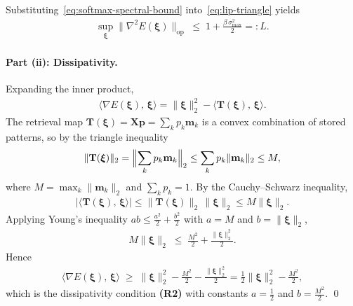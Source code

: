 Substituting~\eqref{eq:softmax-spectral-bound} into~\eqref{eq:lip-triangle} yields
\begin{align*}
\sup_{\boldsymbol{\xi}}\|\nabla^{2}E(\boldsymbol{\xi})\|_{\mathrm{op}}
\;\le\; 1 + \frac{\beta\,\sigma_{\max}^{2}}{2}
=: L.
\end{align*}

\paragraph{Part (ii): Dissipativity.}
Expanding the inner product,
\begin{align*}
\langle\nabla E(\boldsymbol{\xi}),\,\boldsymbol{\xi}\rangle
= \|\boldsymbol{\xi}\|_{2}^{2} - \langle\mathbf{T}(\boldsymbol{\xi}),\,\boldsymbol{\xi}\rangle.
\end{align*}
The retrieval map $\mathbf{T}(\boldsymbol{\xi})=\mathbf{X}\mathbf{p}=\sum_{k}p_{k}\mathbf{m}_{k}$ is a convex combination of stored patterns, so by the triangle inequality
\begin{align*}
\|\mathbf{T}(\boldsymbol{\xi})\|_{2}
= \Bigl\|\sum_{k}p_{k}\mathbf{m}_{k}\Bigr\|_{2}
\le \sum_{k}p_{k}\|\mathbf{m}_{k}\|_{2}
\le M,
\end{align*}
where $M=\max_{k}\|\mathbf{m}_{k}\|_{2}$ and $\sum_{k}p_{k}=1$. By the Cauchy--Schwarz inequality,
\begin{align*}
|\langle\mathbf{T}(\boldsymbol{\xi}),\,\boldsymbol{\xi}\rangle|
\le \|\mathbf{T}(\boldsymbol{\xi})\|_{2}\,\|\boldsymbol{\xi}\|_{2}
\le M\|\boldsymbol{\xi}\|_{2}.
\end{align*}
Applying Young's inequality $ab\le\tfrac{a^{2}}{2}+\tfrac{b^{2}}{2}$ with $a=M$ and $b=\|\boldsymbol{\xi}\|_{2}$,
\begin{align*}
M\|\boldsymbol{\xi}\|_{2}
\;\le\; \frac{M^{2}}{2} + \frac{\|\boldsymbol{\xi}\|_{2}^{2}}{2}.
\end{align*}
Hence
\begin{align*}
\langle\nabla E(\boldsymbol{\xi}),\,\boldsymbol{\xi}\rangle
\;\ge\; \|\boldsymbol{\xi}\|_{2}^{2} - \frac{M^{2}}{2} - \frac{\|\boldsymbol{\xi}\|_{2}^{2}}{2}
= \frac{1}{2}\|\boldsymbol{\xi}\|_{2}^{2} - \frac{M^{2}}{2},
\end{align*}
which is the dissipativity condition \textbf{(R2)} with constants $a=\tfrac{1}{2}$ and $b=\tfrac{M^{2}}{2}$. \qed

